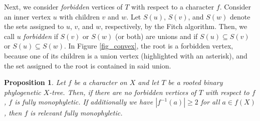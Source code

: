 \documentclass{amsart}
\newtheorem{proposition}[theorem]{Proposition}
\theoremstyle{definition}
\begin{document}
\par\vspace{0.5cm}



Next, we consider \emph{forbidden} vertices of $T$ with respect to a character $f$. Consider an inner vertex $u$ with children $v$ and $w$. Let $S(u)$, $S(v)$, and $S(w)$ denote the sets assigned to $u$, $v$, and $w$, respectively, by the Fitch algorithm. Then, we call $u$ \emph{forbidden} if $S(v)$ or $S(w)$ (or both) are unions and if $S(u)\subseteq S(v)$ or $S(u)\subseteq S(w)$. In Figure \ref{fig_convex}, the root is a forbidden vertex, because one of its children is a union vertex (highlighted with an asterisk), and the set assigned to the root is contained in said union.


\begin{proposition}\label{prop:forbidden} Let $f$ be a character on $X$ and let $T$ be a rooted binary phylogenetic $X$-tree. Then, if there are no forbidden vertices of $T$ with respect to $f$, $f$ is fully monophyletic. If additionally we have $|f^{-1}(a)|\geq 2$ for all $a \in f(X)$, then $f$ is relevant fully monophyletic.
\end{proposition}
\end{document}
